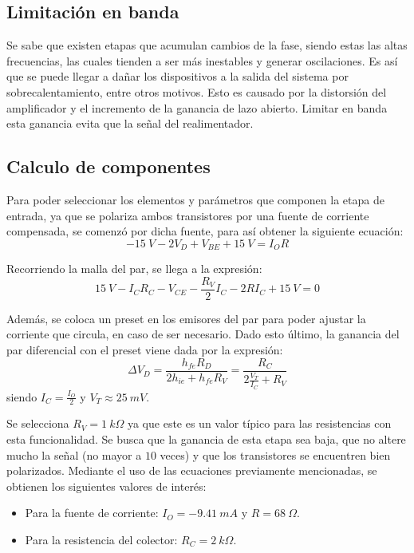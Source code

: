 \subsection{Limitación en banda}
Se sabe que  existen etapas que acumulan cambios de la fase, siendo estas las altas frecuencias, las cuales tienden a ser más inestables y generar oscilaciones. Es así que se puede llegar a dañar los dispositivos a la salida del sistema por sobrecalentamiento, entre otros motivos. Esto es causado por la distorsión del amplificador y el incremento de la ganancia de lazo abierto. Limitar en banda esta ganancia evita que la señal del realimentador.

\subsection{Calculo de componentes}
Para poder seleccionar los elementos y parámetros que componen la etapa de entrada, ya que se polariza ambos transistores por una fuente de corriente compensada, se comenzó por dicha fuente, para así obtener la siguiente ecuación:
\begin{equation}
	-15 \ V - 2V_{D} + V_{BE} + 15 \ V = I_O R 
\end{equation}

Recorriendo la malla del par, se llega a la expresión:
\begin{equation}
	15 \ V - I_C R_C - V_{CE} - \frac{R_V}{2} I_C - 2 R I_C + 15 \ V = 0
\end{equation}

Además, se coloca un preset en los emisores del par para poder ajustar la corriente que circula, en caso de ser necesario. Dado esto último, la ganancia del par diferencial con el preset viene dada por la expresión:
\begin{equation}
	\Delta V_D = \frac{h_{fe} R_D}{2 h_{ie} + h_{fe} R_V} = \frac{R_C}{2 \frac{V_T}{I_C} + R_V}
\end{equation}
siendo $I_C = \frac{I_O}{2}$ y $V_T \approx 25 \ mV$.

Se selecciona $R_V = 1 \ k\Omega$ ya que este es un valor típico para las resistencias con esta funcionalidad. Se busca que la ganancia de esta etapa sea baja, que no altere mucho la señal (no mayor a $10$ veces) y que los transistores se encuentren bien polarizados. Mediante el uso de las ecuaciones previamente mencionadas, se obtienen los siguientes valores de interés:
\begin{itemize}
	\item Para la fuente de corriente: $I_O = -9.41 \ mA$ y $R = 68 \ \Omega$.
	\item Para la resistencia del colector: $R_C = 2 \ k\Omega$.
\end{itemize}
